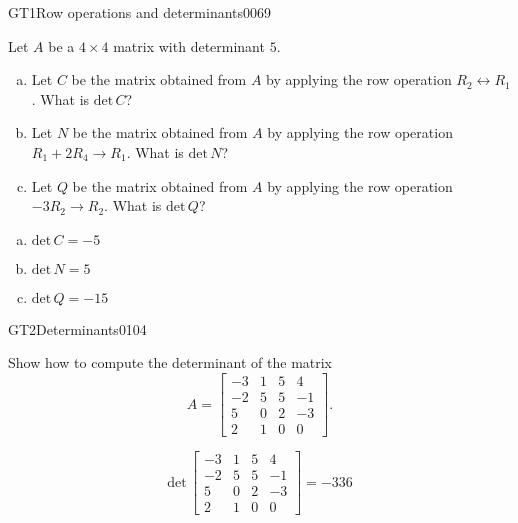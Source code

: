 \begin{exercise}{GT1}{Row operations and determinants}{0069} 
\begin{exerciseStatement} 

Let \(A\) be a \(4 \times 4\) matrix with determinant \(5\).

 

\begin{enumerate}[(a)]
\item Let \(C\) be the matrix obtained from \(A\) by applying the row operation \(R_2 \leftrightarrow R_1\). What is \(\mathrm{det}\,C\)?
\item Let \(N\) be the matrix obtained from \(A\) by applying the row operation \(R_1 + 2 R_4 \to R_1\). What is \(\mathrm{det}\,N\)?
\item Let \(Q\) be the matrix obtained from \(A\) by applying the row operation \(-3 R_2 \to R_2\). What is \(\mathrm{det}\,Q\)?
\end{enumerate}

     \end{exerciseStatement}
 \begin{exerciseAnswer} 

\begin{enumerate}[(a)]
\item \(\mathrm{det}\,C=-5\)
\item \(\mathrm{det}\,N=5\)
\item \(\mathrm{det}\,Q=-15\)
\end{enumerate}

     \end{exerciseAnswer}
 \end{exercise}



\begin{exercise}{GT2}{Determinants}{0104} 
\begin{exerciseStatement} 

Show how to compute the determinant of the matrix \[A=\left[\begin{array}{cccc}
-3 & 1 & 5 & 4 \\
-2 & 5 & 5 & -1 \\
5 & 0 & 2 & -3 \\
2 & 1 & 0 & 0
\end{array}\right].\]

 \end{exerciseStatement}
 \begin{exerciseAnswer} \[\mathrm{det}\,\left[\begin{array}{cccc}
-3 & 1 & 5 & 4 \\
-2 & 5 & 5 & -1 \\
5 & 0 & 2 & -3 \\
2 & 1 & 0 & 0
\end{array}\right]=-336\] \end{exerciseAnswer}
 \end{exercise}


